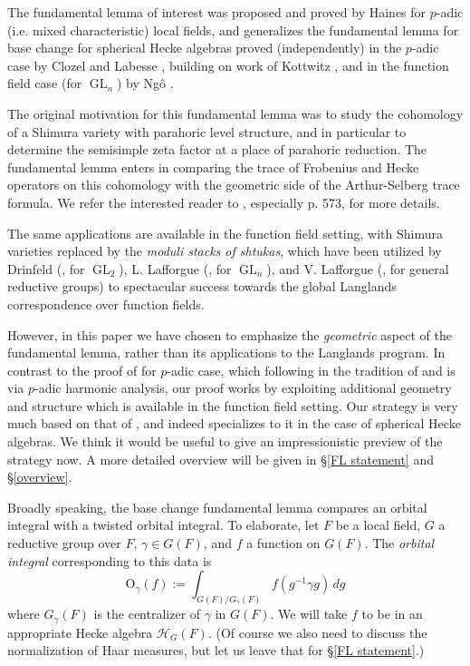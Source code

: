 \documentclass[reqno]{amsart}
\numberwithin{equation}{section}
\newcommand{\Cal}[1]{\mathcal{#1}}
\newcommand{\mrm}[1]{\mathrm{#1}}
\DeclareMathOperator{\GL}{GL}
\theoremstyle{remark}
\numberwithin{equation}{section}
\begin{document}
The fundamental lemma of interest was proposed and proved by Haines \cite{Haines09} for $p$-adic (i.e. mixed characteristic) local fields, and generalizes the fundamental lemma for base change for spherical Hecke algebras proved (independently) in the $p$-adic case by Clozel \cite{Clo90} and Labesse \cite{Lab90}, building on work of Kottwitz \cite{Kott86b}, and in the function field case (for $\GL_n$) by Ng\^{o} \cite{Ngo06}. 

The original motivation for this fundamental lemma was to study the cohomology of a Shimura variety with parahoric level structure, and in particular to determine the semisimple zeta factor at a place of parahoric reduction. The fundamental lemma enters in comparing the trace of Frobenius and Hecke operators on this cohomology with the geometric side of the Arthur-Selberg trace formula. We refer the interested reader to \cite{Haines09}, especially p. 573, for more details. 

The same applications are available in the function field setting, with Shimura varieties replaced by the \emph{moduli stacks of shtukas}, which have been utilized by Drinfeld (\cite{Drin87}, for $\GL_2$), L. Lafforgue (\cite{Laff02}, for $\GL_n$), and V. Lafforgue (\cite{Laff12}, for general reductive groups) to spectacular success towards the global Langlands correspondence over function fields.

 However, in this paper we have chosen to emphasize the \emph{geometric} aspect of the fundamental lemma, rather than its applications to the Langlands program. In contrast to the proof of \cite{Haines09} for $p$-adic case, which following in the tradition of \cite{Clo90} and \cite{Lab90} is via $p$-adic harmonic analysis, our proof works by exploiting additional geometry and structure which is available in the function field setting. Our strategy is very much based on that of \cite{Ngo06}, and indeed specializes to it in the case of spherical Hecke algebras. 
We think it would be useful to give an impressionistic preview of the strategy now. A more detailed overview will be given in \S \ref{FL statement} and \S \ref{overview}. 
 
 Broadly speaking, the base change fundamental lemma compares an orbital integral with a twisted orbital integral. To elaborate, let $F$ be a local field, $G$ a reductive group over $F$, $\gamma \in G(F)$, and $f$ a function on $G(F)$. The \emph{orbital integral} corresponding to this data is 
 \begin{equation}\label{orbital integral}
\mrm{O}_{\gamma}(f)  := \int_{G(F)/G_{\gamma}(F)} f(g^{-1} \gamma g) \, dg
 \end{equation}
 where $G_{\gamma}(F)$ is the centralizer of $\gamma$ in $G(F)$. We will take $f$ to be in an appropriate Hecke algebra $\Cal{H}_G(F)$. (Of course we also need to discuss the normalization of Haar measures, but let us leave that for \S \ref{FL statement}.) 
 
\end{document}
